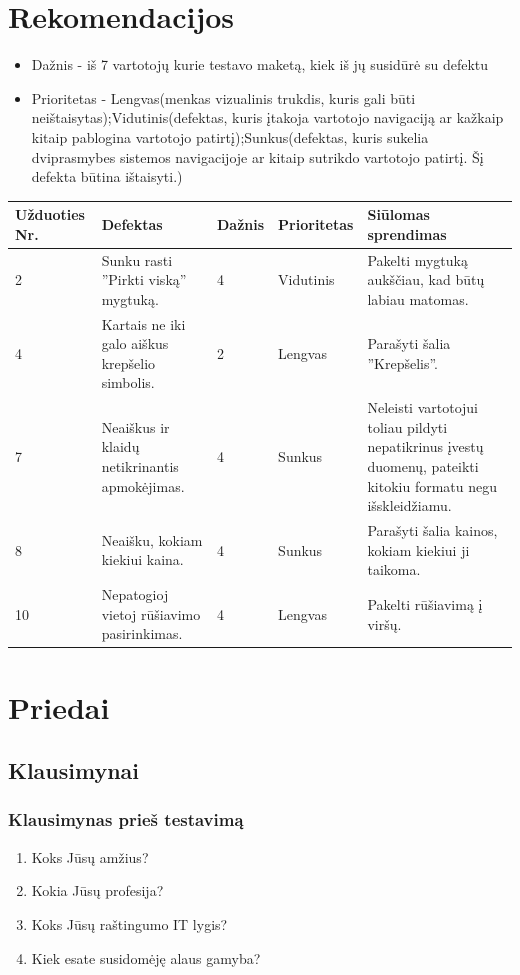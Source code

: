 \documentclass[oneside]{VUMIFPSkursinis}
\begin{document}
\section{Rekomendacijos}
\begin{itemize}
	\item{Dažnis - iš 7 vartotojų kurie testavo maketą, kiek iš jų susidūrė su defektu}
	\item{Prioritetas - Lengvas(menkas vizualinis trukdis, kuris gali būti neištaisytas);Vidutinis(defektas, kuris įtakoja vartotojo navigaciją ar kažkaip kitaip pablogina vartotojo patirtį);Sunkus(defektas, kuris sukelia dviprasmybes sistemos navigacijoje ar kitaip sutrikdo vartotojo patirtį. Šį defekta būtina ištaisyti.)}
\end{itemize}
\begin{center}
    \begin{tabular}{ |p{2cm}| p{4cm} | p{2cm} | p{2cm} | p{5cm} |}
    \hline
	Užduoties Nr.&Defektas&Dažnis&Prioritetas&Siūlomas sprendimas\\ \hline
	2&Sunku rasti ''Pirkti viską'' mygtuką.&4&Vidutinis&Pakelti mygtuką aukščiau, kad būtų labiau matomas. \\ \hline
	4&Kartais ne iki galo aiškus krepšelio simbolis.&2&Lengvas&Parašyti šalia ''Krepšelis''. \\ \hline
	7&Neaiškus ir klaidų netikrinantis apmokėjimas.&4&Sunkus&Neleisti vartotojui toliau pildyti nepatikrinus įvestų duomenų, pateikti kitokiu formatu negu išskleidžiamu. \\ \hline
	8&Neaišku, kokiam kiekiui kaina.&4&Sunkus&Parašyti šalia kainos, kokiam kiekiui ji taikoma. \\ \hline
	10&Nepatogioj vietoj rūšiavimo pasirinkimas.&4&Lengvas&Pakelti rūšiavimą į viršų. \\ \hline
   \hline
    \end{tabular}
\end{center}
\section{Priedai}
	\subsection{Klausimynai}
	\subsubsection{Klausimynas prieš testavimą}
	\begin{enumerate}
			\item{Koks Jūsų amžius?}
			\item{Kokia Jūsų profesija?}
			\item{Koks Jūsų raštingumo IT lygis?}
			\item{Kiek esate susidomėję alaus gamyba?}
	\end{enumerate}
\end{document}
